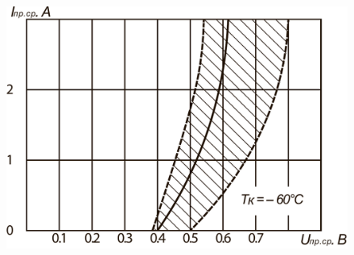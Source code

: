 \documentclass[a4paper,14pt]{extreport}
\begin{document}
  \begin{figure}[h!]\label{im2}
  \begin{center}
	\begin{minipage}[h!]{0.524\linewidth}
		\includegraphics[width=1\linewidth]{1.14.pdf} \\
	\end{minipage}
\end{center}
\end{figure}
\end{document}
